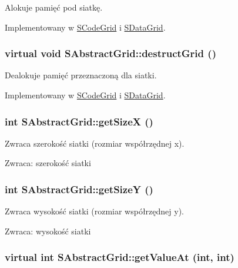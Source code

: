 Alokuje pamięć pod siatkę. 

Implementowany w \hyperlink{classSCodeGrid_f15ba156433f88a40887e5ba72d9201a}{SCodeGrid} i \hyperlink{classSDataGrid_5af888335764c1ba959b6ef964223b6d}{SDataGrid}.\hypertarget{classSAbstractGrid_fb63d8cf5210c3606a3b7add19f06833}{
\subsubsection[{destructGrid}]{\setlength{\rightskip}{0pt plus 5cm}virtual void SAbstractGrid::destructGrid ()}}
\label{classSAbstractGrid_fb63d8cf5210c3606a3b7add19f06833}


Dealokuje pamięć przeznaczoną dla siatki. 

Implementowany w \hyperlink{classSCodeGrid_6bd4c1bf841bd09c2ffb2e019c08b4ed}{SCodeGrid} i \hyperlink{classSDataGrid_c9c0ef298fb96c56f9f9796720a41489}{SDataGrid}.\hypertarget{classSAbstractGrid_79e2d4403dc5b76fe67e36169bb9f706}{
\subsubsection[{getSizeX}]{\setlength{\rightskip}{0pt plus 5cm}int SAbstractGrid::getSizeX ()}}
\label{classSAbstractGrid_79e2d4403dc5b76fe67e36169bb9f706}


Zwraca szerokość siatki (rozmiar współrzędnej x). \begin{Desc}
\item[Zwraca:]szerokość siatki \end{Desc}
\hypertarget{classSAbstractGrid_a1b6e5aaf2c870e1ef15a9f93459b820}{
\subsubsection[{getSizeY}]{\setlength{\rightskip}{0pt plus 5cm}int SAbstractGrid::getSizeY ()}}
\label{classSAbstractGrid_a1b6e5aaf2c870e1ef15a9f93459b820}


Zwraca wysokość siatki (rozmiar współrzędnej y). \begin{Desc}
\item[Zwraca:]wysokość siatki \end{Desc}
\hypertarget{classSAbstractGrid_d8772e08d58f970d885775cb9682bf6d}{
\subsubsection[{getValueAt}]{\setlength{\rightskip}{0pt plus 5cm}virtual int SAbstractGrid::getValueAt (int, \/  int)}}
\label{classSAbstractGrid_d8772e08d58f970d885775cb9682bf6d}


